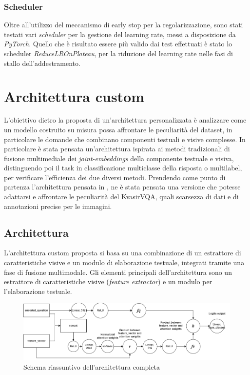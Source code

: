 \documentclass[../main.tex]{subfiles}
\begin{document}
\subsubsection{Scheduler}

Oltre all'utilizzo del meccanismo di early stop per la regolarizzazione, sono stati testati vari \textit{scheduler} per la gestione del learning rate, messi a disposizione da \textit{PyTorch}. 
Quello che è risultato essere più valido dai test effettuati è stato lo scheduler \textit{ReduceLROnPlateau}, per la riduzione del learning rate nelle fasi di stallo dell'addestramento.

\section{Architettura custom}

L’obiettivo dietro la proposta di un'architettura personalizzata è analizzare come un modello costruito su misura possa affrontare le peculiarità del dataset, in particolare le domande che combinano componenti testuali e visive complesse. 
In particolare è stata pensata un'architettura ispirata ai metodi tradizionali di fusione multimediale dei \textit{joint-embeddings} della componente testuale e visiva, distinguendo poi il task in classificazione multiclasse della risposta o multilabel, per verificare l'efficienza dei due diversi metodi. 
Prendendo come punto di partenza l'architettura pensata in \cite{DBLP:journals/corr/AndersonHBTJGZ17}, ne è stata pensata una versione che potesse adattarsi e affrontare le peculiarità del KvasirVQA, quali scarsezza di dati e di annotazioni precise per le immagini.

\subsection{Architettura}

L’architettura custom proposta si basa su una combinazione di un estrattore di caratteristiche visive e un modulo di elaborazione testuale, integrati tramite una fase di fusione multimodale. Gli elementi principali dell'architettura sono un estrattore di caratteristiche visive (\textit{feature extractor}) e un modulo per l'elaborazione testuale.

\begin{figure}[H]
    \centering
    \includegraphics[width=1.05\linewidth]{static/CustomNN.drawio.png}
    \caption{Schema riassuntivo dell'architettura completa}
    \label{fig:enter-label}
\end{figure}
\end{document}
